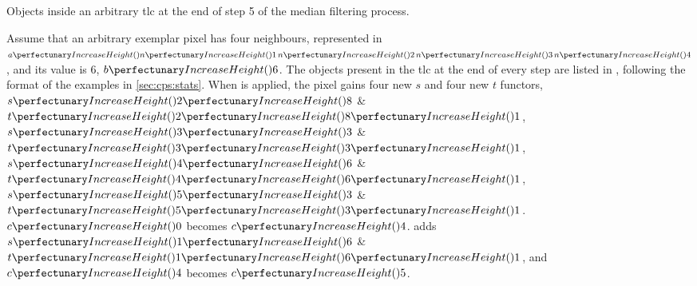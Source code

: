\begin{cpobjectsfloat}
\begin{cpobjects}
\end{cpobjects}
\caption{\label{objs:medianfilter:ex5}Objects inside an arbitrary \gls{tlc} at the end of step 5 of the median filtering process.}
\end{cpobjectsfloat}


Assume that an arbitrary exemplar pixel has four neighbours, represented in \(\cpfunc{a}{\cpfunc{n}{1} \, \cpfunc{n}{2} \, \cpfunc{n}{3} \, \cpfunc{n}{4}}\), and its value is 6, \(\cpfunc{b}{6}\).  The objects present in the \gls{tlc} at the end of every step are listed in , following the format of the examples in \vref{sec:cps:stats}.  When  is applied, the pixel gains four new \(s\) and four new \(t\) functors, \(\cpfuncn{s}{2}{8}\) \& \(\cpfuncnn{t}{2}{8}{1}\), \(\cpfuncn{s}{3}{3}\) \& \(\cpfuncnn{t}{3}{3}{1}\), \(\cpfuncn{s}{4}{6}\) \& \(\cpfuncnn{t}{4}{6}{1}\), \(\cpfuncn{s}{5}{3}\) \& \(\cpfuncnn{t}{5}{3}{1}\).  \(\cpfunc{c}{0}\) becomes \(\cpfunc{c}{4}\).   adds \(\cpfuncn{s}{1}{6}\) \& \(\cpfuncnn{t}{1}{6}{1}\), and \(\cpfunc{c}{4}\) becomes \(\cpfunc{c}{5}\).

